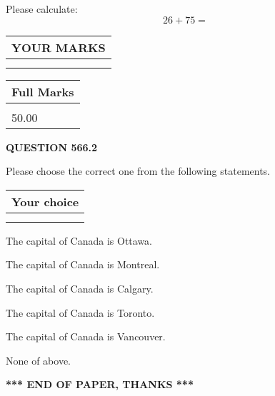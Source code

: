\documentclass[12pt]{article}
\begin{document}
  
 
Please calculate:
\begin{equation}
26 +  %
75 = \nonumber
\end{equation}
 

 

 
  
\vspace{0.2in}
  
\noindent\begin{tabular}{|l|}
\hline
 YOUR MARKS  \\
\hline
 \\ 
 \\ 
\hline
\end{tabular}
\hspace{0.05in} \begin{tabular}{|l|}
\hline
 Full Marks  \\
\hline
 \\ 
50.00 \\
\hline
\end{tabular}
{\textbf{\Large{QUESTION
566.2 
}}}
  
  
Please choose the correct one from the following statements.
  
  
\noindent\hspace{3.0in} \begin{tabular}{|l|}
\hline
Your choice \\
\hline
 \\ 
 \\ 
\hline
\end{tabular}
  
  
 
 
The capital of Canada is Ottawa.
 
 
The capital of Canada is Montreal.
 
 
The capital of Canada is Calgary.
 
 
The capital of Canada is Toronto.
 
 
The capital of Canada is Vancouver.
 
 
 None of above.
 
 
   
   
 \vspace{0.2in}
 
   
   
   
   
\vspace{1.0in} 
{\textbf{\large{ *** END OF PAPER, THANKS *** }}} 
   
\end{document}
